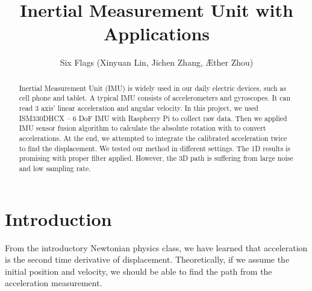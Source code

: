 \documentclass[%
 reprint,
 amsmath,amssymb,
 aps,
]{revtex4-2}
\begin{document}
 


\title{Inertial Measurement Unit with Applications}%

\author{Six Flags (Xinyuan Lin, Jichen Zhang, \AE ther Zhou)}


\begin{abstract}
Inertial Measurement Unit (IMU) is widely used in our daily electric devices, such as cell phone and tablet. A typical IMU consists of accelerometers and gyroscopes. It can read 3 axis’ linear acceleration and angular velocity. In this project, we used ISM330DHCX – 6 DoF IMU with Raspberry Pi to collect raw data. Then we applied IMU sensor fusion algorithm to calculate the absolute rotation with to convert accelerations. At the end, we attempted to integrate the calibrated acceleration twice to find the displacement. We tested our method in different settings. The 1D results is promising with proper filter applied. However, the 3D path is suffering from large noise and low sampling rate. 
\end{abstract}

\maketitle


\section{Introduction}
From the introductory Newtonian physics class, we have learned that acceleration is the second time derivative of displacement. Theoretically, if we assume the initial position and velocity, we should be able to find the path from the acceleration measurement. 
\end{document}
